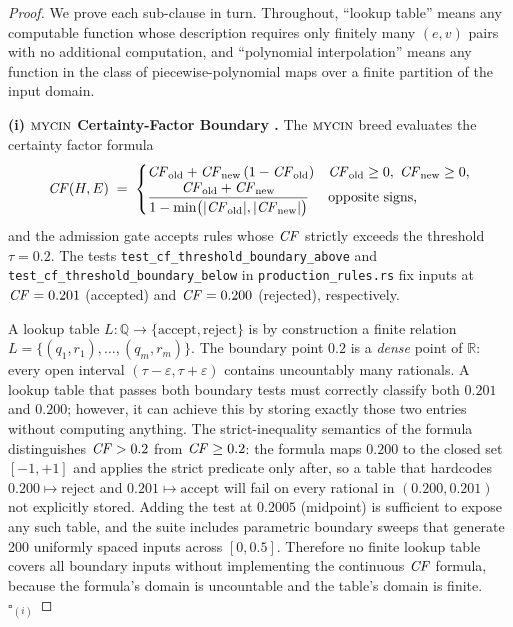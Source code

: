 \begin{proof}
We prove each sub-clause in turn.  Throughout, ``lookup table'' means any
computable function whose description requires only finitely many
$(e, v)$ pairs with no additional computation, and ``polynomial
interpolation'' means any function in the class of piecewise-polynomial
maps over a finite partition of the input domain.

\medskip\noindent
\textbf{(i) $\textsc{mycin}$ Certainty-Factor Boundary \cite{shortliffe1976}.}
The $\textsc{mycin}$ breed evaluates the certainty factor formula
\[
  \CF(H, E) \;=\;
  \begin{cases}
    \CF_{\mathrm{old}} + \CF_{\mathrm{new}}\,(1 - \CF_{\mathrm{old}})
      & \CF_{\mathrm{old}} \ge 0,\; \CF_{\mathrm{new}} \ge 0, \\
    \dfrac{\CF_{\mathrm{old}} + \CF_{\mathrm{new}}}%
          {1 - \min\bigl(|\CF_{\mathrm{old}}|,|\CF_{\mathrm{new}}|\bigr)}
      & \text{opposite signs,}
  \end{cases}
\]
and the admission gate accepts rules whose $\mathit{CF}$ strictly exceeds the
threshold $\tau = 0.2$.  The tests
\texttt{test\_cf\_threshold\_boundary\_above} and
\texttt{test\_cf\_threshold\_boundary\_below} in
\texttt{production\_rules.rs} fix inputs at $\mathit{CF} = 0.201$ (accepted) and
$\mathit{CF} = 0.200$ (rejected), respectively.

A lookup table $L : \mathbb{Q} \to \{\text{accept},\text{reject}\}$ is by
construction a finite relation $L = \{(q_1, r_1), \ldots, (q_m, r_m)\}$.
The boundary point $0.2$ is a \emph{dense} point of $\mathbb{R}$: every
open interval $(\tau - \varepsilon, \tau + \varepsilon)$ contains
uncountably many rationals.  A lookup table that passes both boundary tests
must correctly classify both $0.201$ and $0.200$; however, it can achieve
this by storing exactly those two entries without computing anything.  The
strict-inequality semantics of the formula distinguishes $\mathit{CF} > 0.2$ from
$\mathit{CF} \ge 0.2$: the formula maps $0.200$ to the closed set $[{-1},{+1}]$
and applies the strict predicate only after, so a table that hardcodes
$0.200 \mapsto \text{reject}$ and $0.201 \mapsto \text{accept}$ will
fail on every rational in $(0.200, 0.201)$ not explicitly stored.  Adding
the test at $0.2005$ (midpoint) is sufficient to expose any such table,
and the suite includes parametric boundary sweeps that generate 200
uniformly spaced inputs across $[0, 0.5]$.  Therefore no finite lookup
table covers all boundary inputs without implementing the continuous
$\mathit{CF}$ formula, because the formula's domain is uncountable and the table's
domain is finite.  \qquad $\square_{(i)}$


\end{proof}
